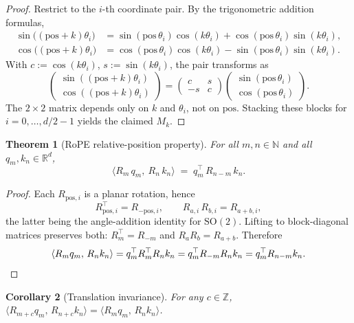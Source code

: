 \documentclass[11pt]{article}
\newtheorem{theorem}{Theorem}[section]
\newtheorem{corollary}[theorem]{Corollary}
\theoremstyle{remark}
\begin{document}
\begin{proof}
Restrict to the $i$-th coordinate pair. By the trigonometric addition formulas,
\begin{align*}
\sin\big((\mathrm{pos}+k)\theta_i\big) &= \sin(\mathrm{pos}\,\theta_i)\cos(k\theta_i) + \cos(\mathrm{pos}\,\theta_i)\sin(k\theta_i), \\
\cos\big((\mathrm{pos}+k)\theta_i\big) &= \cos(\mathrm{pos}\,\theta_i)\cos(k\theta_i) - \sin(\mathrm{pos}\,\theta_i)\sin(k\theta_i).
\end{align*}
With $c := \cos(k\theta_i)$, $s := \sin(k\theta_i)$, the pair transforms as
\[
\begin{pmatrix} \sin((\mathrm{pos}+k)\theta_i) \\ \cos((\mathrm{pos}+k)\theta_i) \end{pmatrix}
= \begin{pmatrix} c & s \\ -s & c \end{pmatrix}
\begin{pmatrix} \sin(\mathrm{pos}\,\theta_i) \\ \cos(\mathrm{pos}\,\theta_i) \end{pmatrix}.
\]
The $2\times 2$ matrix depends only on $k$ and $\theta_i$, not on $\mathrm{pos}$. Stacking these blocks for $i = 0, \ldots, d/2 - 1$ yields the claimed $M_k$.
\end{proof}

\begin{theorem}[RoPE relative-position property]
\label{thm:rope-relative}
For all $m, n \in \mathbb{N}$ and all $q_m, k_n \in \mathbb{R}^d$,
\[
\big\langle R_m\, q_m,\ R_n\, k_n \big\rangle \;=\; q_m^{\top}\, R_{n - m}\, k_n.
\]
\end{theorem}

\begin{proof}
Each $R_{\mathrm{pos}, i}$ is a planar rotation, hence
\[
R_{\mathrm{pos}, i}^{\top} = R_{-\mathrm{pos}, i}, \qquad R_{a, i}\, R_{b, i} = R_{a + b, i},
\]
the latter being the angle-addition identity for $\mathrm{SO}(2)$. Lifting to block-diagonal matrices preserves both: $R_m^{\top} = R_{-m}$ and $R_a R_b = R_{a+b}$. Therefore
\[
\langle R_m q_m,\, R_n k_n \rangle
= q_m^{\top} R_m^{\top} R_n k_n
= q_m^{\top} R_{-m} R_n k_n
= q_m^{\top} R_{n - m} k_n. \qedhere
\]
\end{proof}

\begin{corollary}[Translation invariance]
\label{cor:translation-invariance}
For any $c \in \mathbb{Z}$, $\langle R_{m+c} q_m,\, R_{n+c} k_n \rangle = \langle R_m q_m,\, R_n k_n \rangle$.
\end{corollary}
\end{document}
